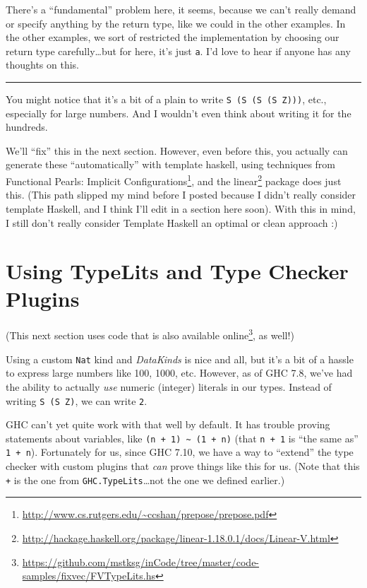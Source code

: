 \documentclass[]{article}
\renewcommand{\href}[2]{#2\footnote{\url{#1}}}
\begin{document}
There's a ``fundamental'' problem here, it seems, because we can't really demand
or specify anything by the return type, like we could in the other examples. In
the other examples, we sort of restricted the implementation by choosing our
return type carefully\ldots but for here, it's just \texttt{a}. I'd love to hear
if anyone has any thoughts on this.

\begin{center}\rule{0.5\linewidth}{0.5pt}\end{center}

You might notice that it's a bit of a plain to write
\texttt{S\ (S\ (S\ (S\ Z)))}, etc., especially for large numbers. And I wouldn't
even think about writing it for the hundreds.

We'll ``fix'' this in the next section. However, even before this, you actually
can generate these ``automatically'' with template haskell, using techniques
from \href{http://www.cs.rutgers.edu/~ccshan/prepose/prepose.pdf}{Functional
Pearls: Implicit Configurations}, and the
\href{http://hackage.haskell.org/package/linear-1.18.0.1/docs/Linear-V.html}{linear}
package does just this. (This path slipped my mind before I posted because I
didn't really consider template Haskell, and I think I'll edit in a section here
soon). With this in mind, I still don't really consider Template Haskell an
optimal or clean approach :)

\section{Using TypeLits and Type Checker
Plugins}\label{using-typelits-and-type-checker-plugins}

(This next section uses code that is
\href{https://github.com/mstksg/inCode/tree/master/code-samples/fixvec/FVTypeLits.hs}{also
available online}, as well!)

Using a custom \texttt{Nat} kind and \emph{DataKinds} is nice and all, but it's
a bit of a hassle to express large numbers like 100, 1000, etc. However, as of
GHC 7.8, we've had the ability to actually \emph{use} numeric (integer) literals
in our types. Instead of writing \texttt{S\ (S\ Z)}, we can write \texttt{2}.

GHC can't yet quite work with that well by default. It has trouble proving
statements about variables, like
\texttt{(n\ +\ 1)\ \textasciitilde{}\ (1\ +\ n)} (that \texttt{n\ +\ 1} is ``the
same as'' \texttt{1\ +\ n}). Fortunately for us, since GHC 7.10, we have a way
to ``extend'' the type checker with custom plugins that \emph{can} prove things
like this for us. (Note that this \texttt{+} is the one from
\texttt{GHC.TypeLits}\ldots not the one we defined earlier.)
\end{document}
